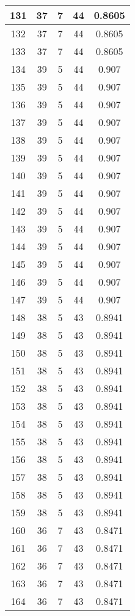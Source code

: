 \documentclass[letterpaper, 12pt]{article}
\begin{document}
\begin{longtable}{|c|c|c|c|c|}
\hline
131 & 37 & 7 & 44 & 0.8605 \\
\hline
132 & 37 & 7 & 44 & 0.8605 \\
\hline
133 & 37 & 7 & 44 & 0.8605 \\
\hline
134 & 39 & 5 & 44 & 0.907 \\
\hline
135 & 39 & 5 & 44 & 0.907 \\
\hline
136 & 39 & 5 & 44 & 0.907 \\
\hline
137 & 39 & 5 & 44 & 0.907 \\
\hline
138 & 39 & 5 & 44 & 0.907 \\
\hline
139 & 39 & 5 & 44 & 0.907 \\
\hline
140 & 39 & 5 & 44 & 0.907 \\
\hline
141 & 39 & 5 & 44 & 0.907 \\
\hline
142 & 39 & 5 & 44 & 0.907 \\
\hline
143 & 39 & 5 & 44 & 0.907 \\
\hline
144 & 39 & 5 & 44 & 0.907 \\
\hline
145 & 39 & 5 & 44 & 0.907 \\
\hline
146 & 39 & 5 & 44 & 0.907 \\
\hline
147 & 39 & 5 & 44 & 0.907 \\
\hline
148 & 38 & 5 & 43 & 0.8941 \\
\hline
149 & 38 & 5 & 43 & 0.8941 \\
\hline
150 & 38 & 5 & 43 & 0.8941 \\
\hline
151 & 38 & 5 & 43 & 0.8941 \\
\hline
152 & 38 & 5 & 43 & 0.8941 \\
\hline
153 & 38 & 5 & 43 & 0.8941 \\
\hline
154 & 38 & 5 & 43 & 0.8941 \\
\hline
155 & 38 & 5 & 43 & 0.8941 \\
\hline
156 & 38 & 5 & 43 & 0.8941 \\
\hline
157 & 38 & 5 & 43 & 0.8941 \\
\hline
158 & 38 & 5 & 43 & 0.8941 \\
\hline
159 & 38 & 5 & 43 & 0.8941 \\
\hline
160 & 36 & 7 & 43 & 0.8471 \\
\hline
161 & 36 & 7 & 43 & 0.8471 \\
\hline
162 & 36 & 7 & 43 & 0.8471 \\
\hline
163 & 36 & 7 & 43 & 0.8471 \\
\hline
164 & 36 & 7 & 43 & 0.8471 \\

\end{longtable}
\end{document}
